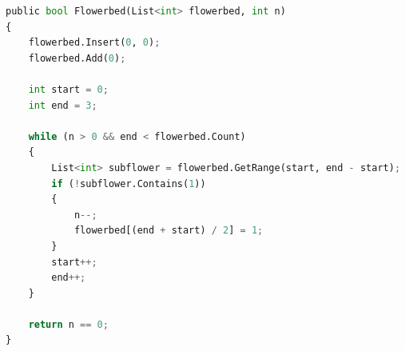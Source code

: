 \documentclass[12pt]{article}
\begin{document}
\begin{lstlisting}[language=Python, caption=Csharp, label=code:PyTest]
public bool Flowerbed(List<int> flowerbed, int n)
{
    flowerbed.Insert(0, 0);
    flowerbed.Add(0);

    int start = 0;
    int end = 3;

    while (n > 0 && end < flowerbed.Count)
    { 
        List<int> subflower = flowerbed.GetRange(start, end - start);
        if (!subflower.Contains(1))
        {
            n--;
            flowerbed[(end + start) / 2] = 1; 
        }
        start++;
        end++;
    }

    return n == 0;
}
\end{lstlisting}
\end{document}
